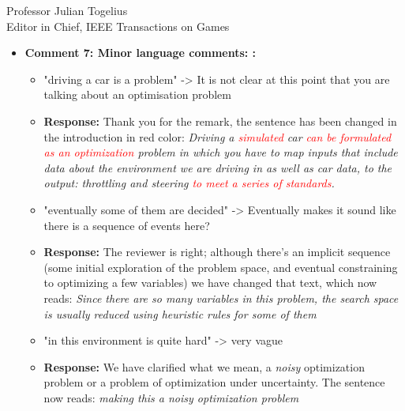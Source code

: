 \documentclass[10pt]{letter} %
\begin{document}
\begin{letter}{Professor Julian Togelius \\ Editor in Chief, IEEE Transactions on Games}
\begin{enumerate}
\begin{itemize}
	\item {\bf   Comment 7: Minor language comments: :} 
				\begin{itemize}
				\item 	"driving a car is a problem" -> It is not clear at this point that you are talking about an optimisation problem
				\item {\bf Response:} 
				Thank you for the remark, the sentence has been changed in the introduction in red color:
				{\em  Driving a \textcolor{red}{simulated} car \textcolor{red}{can be formulated as an optimization} problem in which you have to map inputs that include data about the environment we are driving in as well as car
data, to the output: throttling and steering \textcolor{red}{to meet a series of standards}.}
				\\
				\item 	"eventually some of them are decided" -> Eventually makes it sound like there is a sequence of events here?
				\item {\bf Response:} 
The reviewer is right; although there's an implicit sequence (some initial exploration of the problem space, and eventual constraining to optimizing a few variables) we have changed that text, which now reads: {\em Since there are so many variables in this problem, the search space is usually reduced using heuristic rules for some of them}
				\item 	"in this environment is quite hard" -> very vague
 				\item {\bf Response:} %
                                  We have clarified what we mean, a {\em noisy} optimization problem or a problem of optimization under uncertainty. The sentence now reads: {\em making this a {\em noisy} optimization problem }



\end{itemize}
\end{itemize}
\end{enumerate}
\end{letter}
\end{document}
